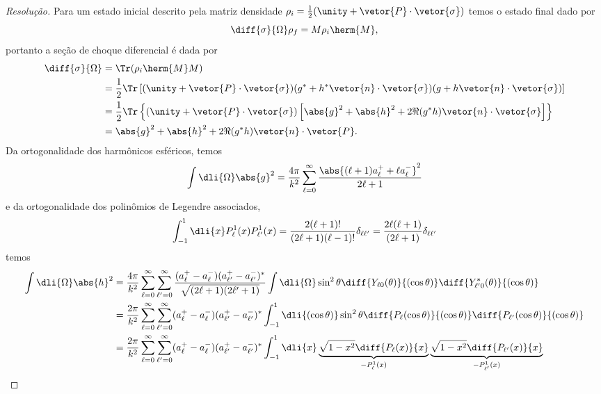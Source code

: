 \begin{proof}[Resolução]
   Para um estado inicial descrito pela matriz densidade \(\rho_i = \frac12 (\unity + \vetor{P}\cdot \vetor{\sigma})\) temos o estado final dado por
   \begin{equation*}
      \diff{\sigma}{\Omega} \rho_f = M \rho_i \herm{M},
   \end{equation*}
   portanto a seção de choque diferencial é dada por
   \begin{align*}
      \diff{\sigma}{\Omega} &= \Tr(\rho_i \herm{M} M)\\
                            &= \frac12\Tr\left[(\unity + \vetor{P}\cdot\vetor{\sigma})(g^* + h^*\vetor{n}\cdot\vetor{\sigma})(g + h\vetor{n}\cdot\vetor{\sigma})\right]\\
                            &= \frac12\Tr\left\{(\unity + \vetor{P}\cdot\vetor{\sigma})\left[\abs{g}^2 + \abs{h}^2 + 2\Re(g^*h) \vetor{n}\cdot \vetor{\sigma}\right]\right\}\\
                            &= \abs{g}^2 + \abs{h}^2 + 2\Re(g^*h) \vetor{n}\cdot\vetor{P}.
   \end{align*}
   Da ortogonalidade dos harmônicos esféricos, temos
   \begin{equation*}
      \int \dli{\Omega} \abs{g}^2 = \frac{4\pi}{k^2}\sum_{\ell = 0}^\infty \frac{\abs{(\ell + 1)a_{\ell}^+ + \ell a_{\ell}^-}^2}{2\ell + 1}
   \end{equation*}
   e da ortogonalidade dos polinômios de Legendre associados,
   \begin{equation*}
      \int_{-1}^{1} \dli{x} P_\ell^1(x) P_{\ell'}^1(x) = \frac{2(\ell + 1)!}{(2\ell + 1)(\ell - 1)!}\delta_{\ell \ell'} = \frac{2\ell(\ell + 1)}{(2\ell + 1)}\delta_{\ell \ell'}
   \end{equation*}
   temos
   \begin{align*}
      \int \dli{\Omega} \abs{h}^2 &= \frac{4\pi}{k^2}\sum_{\ell = 0}^\infty \sum_{\ell' = 0}^\infty \frac{(a_\ell^+ - a_\ell^-)(a_{\ell'}^+ - a_{\ell'}^-)^*}{\sqrt{(2\ell + 1)(2\ell' + 1)}} \int \dli{\Omega} \sin^2\theta \diff{Y_{\ell 0}(\theta)}{(\cos\theta)} \diff{Y^*_{\ell' 0}(\theta)}{(\cos\theta)}\\
                                  &= \frac{2\pi}{k^2}\sum_{\ell = 0}^\infty \sum_{\ell' = 0}^\infty (a_\ell^+ - a_\ell^-)(a_{\ell'}^+ - a_{\ell'}^-)^* \int_{-1}^{1} \dli{(\cos\theta)} \sin^2\theta \diff{P_\ell(\cos\theta)}{(\cos\theta)} \diff{P_{\ell'}(\cos\theta)}{(\cos\theta)}\\
                                  &= \frac{2\pi}{k^2} \sum_{\ell = 0}^\infty \sum_{\ell' = 0}^\infty (a_\ell^+ - a_\ell^-)(a_{\ell'}^+ - a_{\ell'}^-)^*\int_{-1}^1 \dli{x} \underbrace{\sqrt{1 - x^2} \diff{P_\ell(x)}{x}}_{-P_{\ell}^1(x)} \underbrace{\sqrt{1 - x^2} \diff{P_{\ell'}(x)}{x}}_{-P_{\ell'}^1(x)}\\

\end{align*}
\end{proof}
